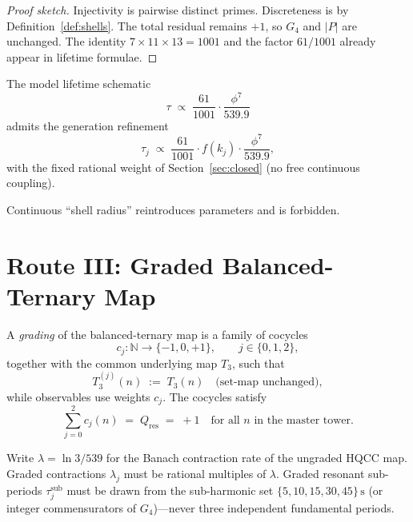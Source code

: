 \begin{proof}[Proof sketch]
Injectivity is pairwise distinct primes. Discreteness is by
Definition~\ref{def:shells}. The total residual remains \(+1\), so \(G_4\) and
\(|P|\) are unchanged. The identity \(7\times 11\times 13=1001\) and the factor
\(61/1001\) already appear in lifetime formulae.
\end{proof}

\begin{corollary}
The model lifetime schematic
\[
\tau \;\propto\; \frac{61}{1001}\cdot\frac{\phi^7}{539.9}
\]
admits the generation refinement
\begin{equation}
\label{eq:tau-g}
\tau_j \;\propto\; \frac{61}{1001}\cdot f(k_j)\cdot\frac{\phi^7}{539.9},
\end{equation}
with the fixed rational weight of Section~\ref{sec:closed}
(no free continuous coupling).
\end{corollary}

\begin{remark}
Continuous ``shell radius'' reintroduces parameters and is forbidden.
\end{remark}

\section{Route III: Graded Balanced-Ternary Map}
\label{sec:route3}

\begin{definition}
\label{def:graded}
A \emph{grading} of the balanced-ternary map is a family of cocycles
\[
c_j\colon\mathbb{N}\to\{-1,0,+1\},\qquad j\in\{0,1,2\},
\]
together with the common underlying map \(T_3\), such that
\begin{equation}
\label{eq:graded-step}
T_3^{(j)}(n)\;:=\;T_3(n)
\quad\text{(set-map unchanged)},
\end{equation}
while observables use weights \(c_j\). The cocycles satisfy
\begin{equation}
\label{eq:cocycle-balance}
\sum_{j=0}^{2} c_j(n)\;=\;Q_{\mathrm{res}}\;=\;+1
\quad\text{for all \(n\) in the master tower}.
\end{equation}
\end{definition}

\begin{definition}
\label{def:rates}
Write \(\lambda=\ln 3/539\) for the Banach contraction rate of the ungraded HQCC
map. Graded contractions \(\lambda_j\) must be rational multiples of \(\lambda\).
Graded resonant sub-periods \(\tau_j^{\mathrm{sub}}\) must be drawn from the
sub-harmonic set \(\{5,10,15,30,45\}\,\mathrm{s}\) (or integer commensurators of
\(G_4\))---never three independent fundamental periods.
\end{definition}


